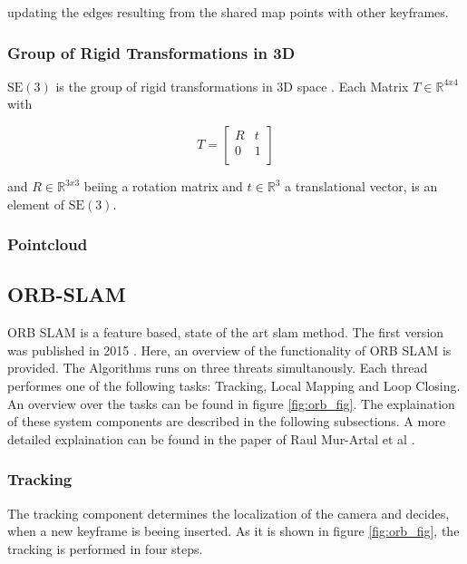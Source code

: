 		updating the edges resulting from the shared map
		points with other keyframes.
		
		\subsubsection{Group of Rigid Transformations in 3D}
		
		$\text{SE}(3)$ is the group of rigid transformations in 3D space \cite{se3}. Each Matrix $ T \in \mathbb{R}^{4x4}$ with 
		
		$$ T = \left[
		\begin{array}{rrr}
		R &  t \\  
		0  & 1 \\ 
		\end{array} \right]$$
		
		and $ R \in \mathbb{R}^{3x3}$ beiing a rotation matrix and $ t \in \mathbb{R}^{3}$ a translational vector, is an element of $\text{SE}(3)$.
		
		\subsubsection{Pointcloud}
		

	\subsection{ORB-SLAM}
	
	ORB SLAM is a feature based, state of the art slam method. The first version was published in 2015 \cite{orb}. 
	Here, an overview of the functionality of ORB SLAM is provided. The Algorithms runs on three threats simultanously.
	Each thread performes one of the following tasks: Tracking, Local Mapping and Loop Closing. An overview over the tasks can be found 
	in figure \ref{fig:orb_fig}. The explaination of these system components are described in the following subsections. 
	A more detailed explaination can be found in the paper of Raul Mur-Artal et al \cite{orb}.
	
	
	\subsubsection{Tracking}
	
	The tracking component determines the localization of the camera and decides, when a new keyframe is beeing inserted.
	As it is shown in figure \ref{fig:orb_fig}, the tracking is performed in four steps.
	
